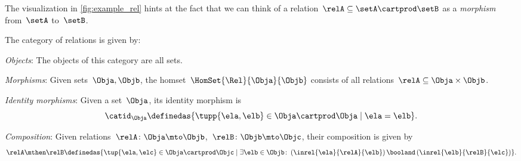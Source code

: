 The visualization in \cref{fig:example_rel} hints at the fact that we can think of a relation~$\relA \subseteq \setA \cartprod \setB$ as a \emph{morphism} from~$\setA$ to~$\setB$.


\begin{ctdefinition}
    \label{def:Rel}
    The category of relations \iindex{\Rel}  is given by:
    \begin{compactenum}
        \item \emph{Objects}: The objects of this category are all sets.
        \item \emph{Morphisms}: Given sets~$\Obja, \Objb$, the homset~$\HomSet{\Rel}{\Obja}{\Objb}$ consists of all relations~$\relA\subseteq \Obja\times \Objb$.
        \item \emph{Identity morphisms}: Given a set~$\Obja$, its identity morphism is
        \begin{equation}
            \catid_\Obja \definedas \{ \tupp{\ela,\elb} \in \Obja \cartprod \Obja \mid  \ela = \elb \}.
        \end{equation}
        \item \emph{Composition}: Given relations~$\relA \colon \Obja\mto \Objb$,~$\relB \colon \Objb\mto \Objc$, their composition is given by
        \begin{equation}
            \label{eq:RelCompRule}
            \relA \mthen \relB \definedas \{\tup{\ela,\elc} \in \Obja \cartprod \Objc \mid  \exists \elb \in \Objb \colon \left(\inrel{\ela}{\relA}{\elb} \right) \booland \left(\inrel{\elb}{\relB}{\elc}\right)\}.
        \end{equation}
    \end{compactenum}
\end{ctdefinition}

